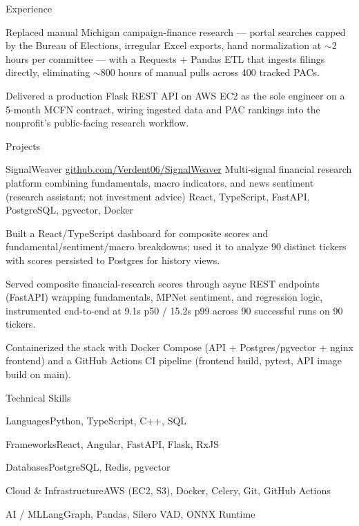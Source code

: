 \documentclass[
	11pt
]{../../../template}
\begin{document}
\begin{rSection}{E}{xperience}
\begin{rSectionEntry}
			\item Replaced manual Michigan campaign-finance research --- portal searches capped by the Bureau of Elections, irregular Excel exports, hand normalization at $\sim$2 hours per committee --- with a Requests + Pandas ETL that ingests filings directly, eliminating $\sim$800 hours of manual pulls across 400 tracked PACs.
			\item Delivered a production Flask REST API on AWS EC2 as the sole engineer on a 5-month MCFN contract, wiring ingested data and PAC rankings into the nonprofit's public-facing research workflow.
		\end{rSectionEntry}
	\end{rSection}

	\begin{rSection}{P}{rojects}
		\begin{rSectionEntry}
			{SignalWeaver}
			{\href{https://github.com/Verdent06/SignalWeaver}{github.com/Verdent06/SignalWeaver}}
			{Multi-signal financial research platform combining fundamentals, macro indicators, and news sentiment (research assistant; not investment advice)}
			{React, TypeScript, FastAPI, PostgreSQL, pgvector, Docker}
			{}

			\item Built a React/TypeScript dashboard for composite scores and fundamental/sentiment/macro breakdowns; used it to analyze 90 distinct tickers with scores persisted to Postgres for history views.
			\item Served composite financial-research scores through async REST endpoints (FastAPI) wrapping fundamentals, MPNet sentiment, and regression logic, instrumented end-to-end at 9.1s p50 / 15.2s p99 across 90 successful runs on 90 tickers.
			\item Containerized the stack with Docker Compose (API + Postgres/pgvector + nginx frontend) and a GitHub Actions CI pipeline (frontend build, pytest, API image build on main).
		\end{rSectionEntry}
	\end{rSection}

	\begin{rSection}{T}{echnical Skills}
		\begin{rSet}{Languages}{Python, TypeScript, C++, SQL}
		\end{rSet}
		\begin{rSet}{Frameworks}{React, Angular, FastAPI, Flask, RxJS}
		\end{rSet}
		\begin{rSet}{Databases}{PostgreSQL, Redis, pgvector}
		\end{rSet}
		\begin{rSet}{Cloud \& Infrastructure}{AWS (EC2, S3), Docker, Celery, Git, GitHub Actions}
		\end{rSet}
		\begin{rSet}{AI / ML}{LangGraph, Pandas, Silero VAD, ONNX Runtime}
		\end{rSet}
	\end{rSection}
\end{document}
